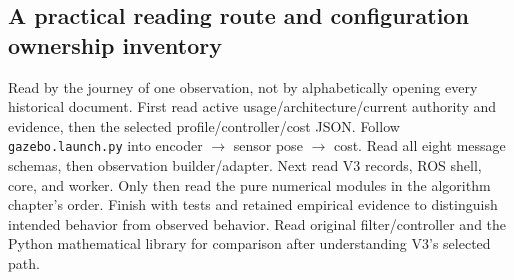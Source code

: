 \documentclass[
  10pt,
  letterpaper,
]{article}
\newcommand{\passthrough}[1]{#1}
\begin{document}
\subsection{A practical reading route and configuration ownership
inventory}\label{a-practical-reading-route-and-configuration-ownership-inventory}

Read by the journey of one observation, not by alphabetically opening
every historical document. First read active usage/architecture/current
authority and evidence, then the selected profile/controller/cost JSON.
Follow \passthrough{\lstinline!gazebo.launch.py!} into encoder
\(\rightarrow\) sensor pose \(\rightarrow\) cost. Read all eight message
schemas, then observation builder/adapter. Next read V3 records, ROS
shell, core, and worker. Only then read the pure numerical modules in
the algorithm chapter's order. Finish with tests and retained empirical
evidence to distinguish intended behavior from observed behavior. Read
original filter/controller and the Python mathematical library for
comparison after understanding V3's selected path.
\end{document}
